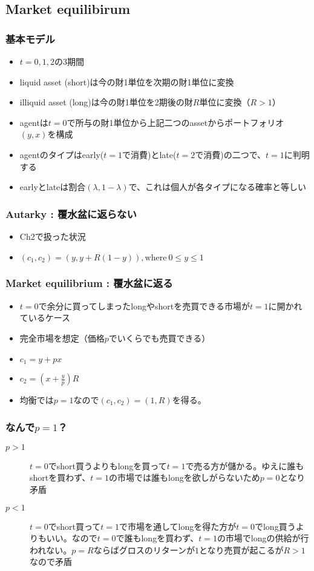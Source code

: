 \documentclass[dvipdfmx, 12pt]{beamer}
\begin{document}
\subsection{Market equilibirum}
\begin{frame}\frametitle{基本モデル}
	\begin{itemize}
		\item $t = 0,1,2$の3期間
		\item liquid asset (short)は今の財1単位を次期の財1単位に変換
		\item illiquid asset (long)は今の財1単位を2期後の財$R$単位に変換（$R > 1$）
		\item agentは$t = 0$で所与の財1単位から上記二つのassetからポートフォリオ$(y, x)$を構成
		\item agentのタイプはearly($t = 1$で消費)とlate($t = 2$で消費)の二つで、$t = 1$に判明する
		\item earlyとlateは割合$(\lambda, 1 - \lambda)$で、これは個人が各タイプになる確率と等しい
	\end{itemize}
\end{frame}
\begin{frame}\frametitle{Autarky : 覆水盆に返らない}
	\begin{itemize}
		\item Ch2で扱った状況
		\item $(c_1, c_2) = (y, y + R(1 - y)), \text{where}\ 0 \leq y \leq 1$
	\end{itemize}
\end{frame}
\begin{frame}\frametitle{Market equilibrium : 覆水盆に返る}
	\begin{itemize}
		\item $t = 0$で余分に買ってしまったlongやshortを売買できる市場が$t = 1$に開かれているケース
		\item 完全市場を想定（価格$p$でいくらでも売買できる）
		\item $c_1 = y + px$
		\item $c_2 = (x + \frac{y}{p})R$
		\item 均衡では$p = 1$なので$(c_1, c_2) = (1, R)$を得る。
	\end{itemize}
\end{frame}
\begin{frame}\frametitle{なんで$p = 1$？}
	\begin{description}
		\item[$p > 1$] $t = 0$でshort買うよりもlongを買って$t = 1$で売る方が儲かる。ゆえに誰もshortを買わず、$t = 1$の市場では誰もlongを欲しがらないため$p = 0$となり矛盾
		\item[$p < 1$] $t = 0$でshort買って$t = 1$で市場を通してlongを得た方が$t = 0$でlong買うよりもいい。なので$t = 0$で誰もlongを買わず、$t = 1$の市場でlongの供給が行われない。$p = R$ならばグロスのリターンが$1$となり売買が起こるが$R > 1$なので矛盾
	\end{description}
\end{frame}
\end{document}
